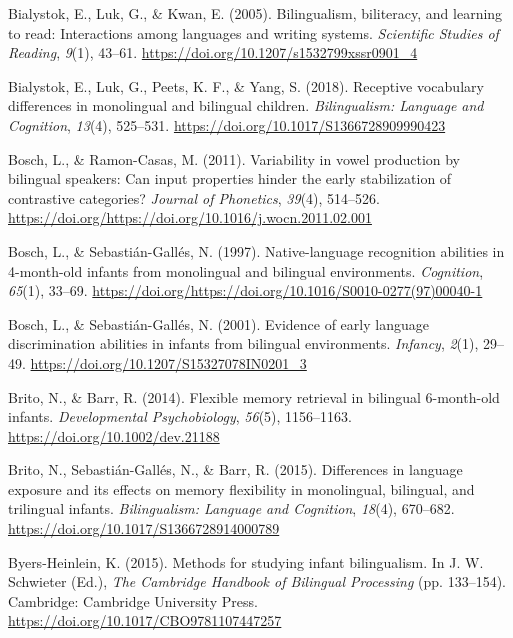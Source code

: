\documentclass[,man,floatsintext]{apa6}
\begin{document}
\leavevmode\hypertarget{ref-bialystok_2005}{}%
Bialystok, E., Luk, G., \& Kwan, E. (2005). Bilingualism, biliteracy, and learning to read: Interactions among languages and writing systems. \emph{Scientific Studies of Reading}, \emph{9}(1), 43--61. \url{https://doi.org/10.1207/s1532799xssr0901_4}

\leavevmode\hypertarget{ref-bialystok_2018}{}%
Bialystok, E., Luk, G., Peets, K. F., \& Yang, S. (2018). Receptive vocabulary differences in monolingual and bilingual children. \emph{Bilingualism: Language and Cognition}, \emph{13}(4), 525--531. \url{https://doi.org/10.1017/S1366728909990423}

\leavevmode\hypertarget{ref-bosch_2011}{}%
Bosch, L., \& Ramon-Casas, M. (2011). Variability in vowel production by bilingual speakers: Can input properties hinder the early stabilization of contrastive categories? \emph{Journal of Phonetics}, \emph{39}(4), 514--526. \url{https://doi.org/https://doi.org/10.1016/j.wocn.2011.02.001}

\leavevmode\hypertarget{ref-bosch_1997}{}%
Bosch, L., \& Sebastián-Gallés, N. (1997). Native-language recognition abilities in 4-month-old infants from monolingual and bilingual environments. \emph{Cognition}, \emph{65}(1), 33--69. \url{https://doi.org/https://doi.org/10.1016/S0010-0277(97)00040-1}

\leavevmode\hypertarget{ref-bosch_2001}{}%
Bosch, L., \& Sebastián-Gallés, N. (2001). Evidence of early language discrimination abilities in infants from bilingual environments. \emph{Infancy}, \emph{2}(1), 29--49. \url{https://doi.org/10.1207/S15327078IN0201_3}

\leavevmode\hypertarget{ref-brito_2014}{}%
Brito, N., \& Barr, R. (2014). Flexible memory retrieval in bilingual 6-month-old infants. \emph{Developmental Psychobiology}, \emph{56}(5), 1156--1163. \url{https://doi.org/10.1002/dev.21188}

\leavevmode\hypertarget{ref-brito_2015}{}%
Brito, N., Sebastián-Gallés, N., \& Barr, R. (2015). Differences in language exposure and its effects on memory flexibility in monolingual, bilingual, and trilingual infants. \emph{Bilingualism: Language and Cognition}, \emph{18}(4), 670--682. \url{https://doi.org/10.1017/S1366728914000789}

\leavevmode\hypertarget{ref-byers_heinlein_2015}{}%
Byers-Heinlein, K. (2015). Methods for studying infant bilingualism. In J. W. Schwieter (Ed.), \emph{The Cambridge Handbook of Bilingual Processing} (pp. 133--154). Cambridge: Cambridge University Press. \url{https://doi.org/10.1017/CBO9781107447257}
\end{document}
